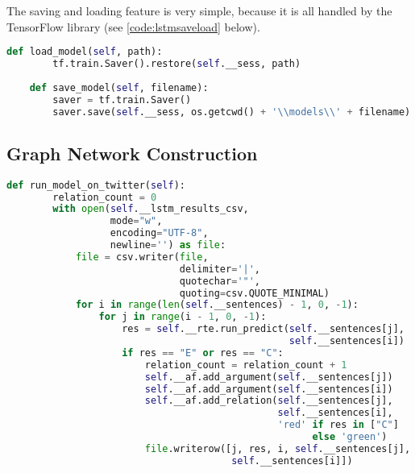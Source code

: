             The saving and loading feature is very simple, because it is all handled by the TensorFlow library (see \cref{code:lstmsaveload} below).
            
            \begin{lstlisting}[language=Python, caption=Saving and Loading Functions, label=code:lstmsaveload]
    def load_model(self, path):
        tf.train.Saver().restore(self.__sess, path)
        
    def save_model(self, filename):
        saver = tf.train.Saver()
        saver.save(self.__sess, os.getcwd() + '\\models\\' + filename)
            \end{lstlisting}
    
    \subsection{Graph Network Construction} \label{graphnetwork}
    
        
        
        \begin{lstlisting}[language=Python, caption=Constructing Directed Graph from Results, label=code:lstmdigraph]
    def run_model_on_twitter(self):
        relation_count = 0
        with open(self.__lstm_results_csv, 
                  mode="w", 
                  encoding="UTF-8", 
                  newline='') as file:
            file = csv.writer(file, 
                              delimiter='|', 
                              quotechar='"', 
                              quoting=csv.QUOTE_MINIMAL)
            for i in range(len(self.__sentences) - 1, 0, -1):
                for j in range(i - 1, 0, -1):
                    res = self.__rte.run_predict(self.__sentences[j], 
                                                 self.__sentences[i])
                    if res == "E" or res == "C":
                        relation_count = relation_count + 1
                        self.__af.add_argument(self.__sentences[j])
                        self.__af.add_argument(self.__sentences[i])
                        self.__af.add_relation(self.__sentences[j], 
                                               self.__sentences[i],
                                               'red' if res in ["C"] 
                                                     else 'green')
                        file.writerow([j, res, i, self.__sentences[j],
                                       self.__sentences[i]])
            \end{lstlisting}
            
